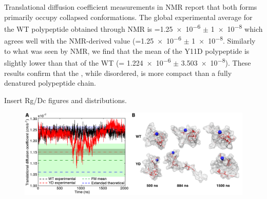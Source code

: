 
Translational diffusion coefficient measurements in NMR report that both \gct{} forms primarily occupy collapsed conformations. The global experimental average for the WT polypeptide obtained through NMR is \diffusion{}=\num{1.25e-6} $\pm$  \SI{1e-8}{\dcunits} which agrees well with the NMR-derived value (\diffusion=\num{1.25e-6} $\pm$  \SI{1e-8}{\dcunits}. Similarly to what was seen by NMR, we find that the mean \diffusion of the Y11D \gct{} polypeptide is slightly lower than that of the WT \gct{} (\diffusion= \num{1.224e-6} $\pm$ \SI{3.503e-8}{\dcunits}). These results confirm that the \gct{}, while disordered, is more compact than a fully denatured polypeptide chain.

Insert Rg/Dc figures and distributions.

\begin{figure}
\centering
\includegraphics[height=0.3\textheight]{figures/dc_time.png}
\end{figure}


